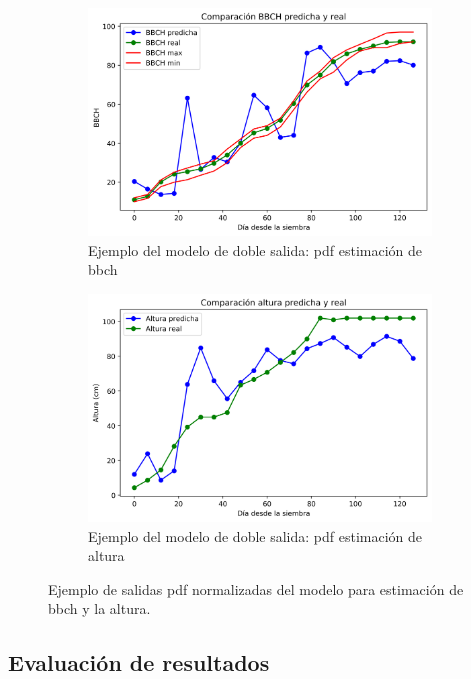 \begin{figure}[h]
\centering
\begin{subfigure}{0.9\textwidth}
  \centering
  \includegraphics[width=0.95\linewidth]{archivos/tfg/Mean/TEST_PARC_FINAL_BH}
  \caption{Ejemplo del modelo de doble salida: \gls{pdf} estimación de \gls{bbch}\label{fig:sub_c1}}
\end{subfigure}
\begin{subfigure}{0.9\textwidth}
  \centering
  \includegraphics[width=0.95\linewidth]{archivos/tfg/Mean/TEST_PARC_FINAL_BH_H}
  \caption{Ejemplo del modelo de doble salida: \gls{pdf} estimación de altura\label{fig:sub_c2}}
\end{subfigure}
\caption{Ejemplo de salidas \gls{pdf} normalizadas del modelo para estimación de \gls{bbch} y la altura. \label{fig:comp_bh}}
\end{figure}
\subsection{Evaluación de resultados}

